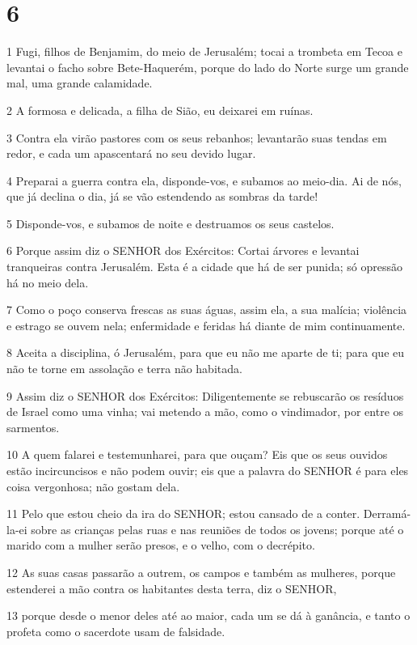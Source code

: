 \chapter{6}

\par 1 Fugi, filhos de Benjamim, do meio de Jerusalém; tocai a trombeta em Tecoa e levantai o facho sobre Bete-Haquerém, porque do lado do Norte surge um grande mal, uma grande calamidade.
\par 2 A formosa e delicada, a filha de Sião, eu deixarei em ruínas.
\par 3 Contra ela virão pastores com os seus rebanhos; levantarão suas tendas em redor, e cada um apascentará no seu devido lugar.
\par 4 Preparai a guerra contra ela, disponde-vos, e subamos ao meio-dia. Ai de nós, que já declina o dia, já se vão estendendo as sombras da tarde!
\par 5 Disponde-vos, e subamos de noite e destruamos os seus castelos.
\par 6 Porque assim diz o SENHOR dos Exércitos: Cortai árvores e levantai tranqueiras contra Jerusalém. Esta é a cidade que há de ser punida; só opressão há no meio dela.
\par 7 Como o poço conserva frescas as suas águas, assim ela, a sua malícia; violência e estrago se ouvem nela; enfermidade e feridas há diante de mim continuamente.
\par 8 Aceita a disciplina, ó Jerusalém, para que eu não me aparte de ti; para que eu não te torne em assolação e terra não habitada.
\par 9 Assim diz o SENHOR dos Exércitos: Diligentemente se rebuscarão os resíduos de Israel como uma vinha; vai metendo a mão, como o vindimador, por entre os sarmentos.
\par 10 A quem falarei e testemunharei, para que ouçam? Eis que os seus ouvidos estão incircuncisos e não podem ouvir; eis que a palavra do SENHOR é para eles coisa vergonhosa; não gostam dela.
\par 11 Pelo que estou cheio da ira do SENHOR; estou cansado de a conter. Derramá-la-ei sobre as crianças pelas ruas e nas reuniões de todos os jovens; porque até o marido com a mulher serão presos, e o velho, com o decrépito.
\par 12 As suas casas passarão a outrem, os campos e também as mulheres, porque estenderei a mão contra os habitantes desta terra, diz o SENHOR,
\par 13 porque desde o menor deles até ao maior, cada um se dá à ganância, e tanto o profeta como o sacerdote usam de falsidade.
